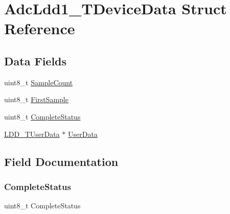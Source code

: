 \hypertarget{struct_adc_ldd1___t_device_data}{}\section{Adc\+Ldd1\+\_\+\+T\+Device\+Data Struct Reference}
\label{struct_adc_ldd1___t_device_data}
\subsection*{Data Fields}
\begin{DoxyCompactItemize}
\item 
uint8\+\_\+t \hyperlink{struct_adc_ldd1___t_device_data_adbc5a45964b0d935283b1ca894581823}{Sample\+Count}
\item 
uint8\+\_\+t \hyperlink{struct_adc_ldd1___t_device_data_af14dee38a129818e1b01b2c6af00f34e}{First\+Sample}
\item 
uint8\+\_\+t \hyperlink{struct_adc_ldd1___t_device_data_a0e4d4ff10ee73335c30ae65e9870376d}{Complete\+Status}
\item 
\hyperlink{group___p_e___types__module_ga0b66a73f87238a782318aa0be7578e35}{L\+D\+D\+\_\+\+T\+User\+Data} $\ast$ \hyperlink{struct_adc_ldd1___t_device_data_a849d3e0bc02b5dc79ba5b17a03bd2a28}{User\+Data}
\end{DoxyCompactItemize}


\subsection{Field Documentation}
\mbox{\label{struct_adc_ldd1___t_device_data_a0e4d4ff10ee73335c30ae65e9870376d}} 
\subsubsection{\texorpdfstring{Complete\+Status}{CompleteStatus}}
{\footnotesize\ttfamily uint8\+\_\+t Complete\+Status}

\mbox{\label{struct_adc_ldd1___t_device_data_af14dee38a129818e1b01b2c6af00f34e}} 
